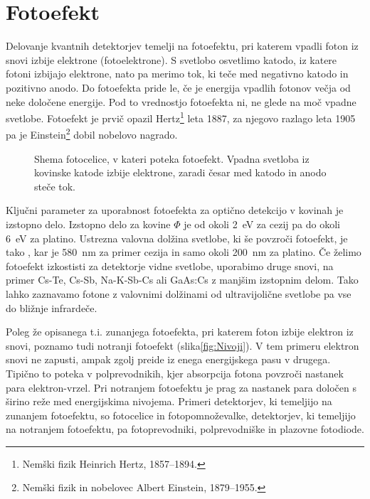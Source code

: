 \section{Fotoefekt}
Delovanje kvantnih detektorjev temelji na fotoefektu, pri katerem vpadli
foton iz snovi izbije elektrone (fotoelektrone). S svetlobo
osvetlimo katodo, iz katere fotoni izbijajo elektrone, nato pa merimo tok, 
ki teče med negativno katodo in pozitivno anodo. 
Do fotoefekta pride le, če je energija vpadlih fotonov večja od neke določene energije.
Pod to vrednostjo fotoefekta ni, ne glede na moč vpadne svetlobe.
Fotoefekt je prvič opazil Hertz\footnote{Nemški fizik Heinrich Hertz, 1857--1894.} 
leta 1887, za njegovo razlago leta
1905 pa je Einstein\footnote{Nemški fizik in nobelovec Albert Einstein, 1879--1955.} 
dobil nobelovo nagrado. 

\begin{figure}[h]
\centering
\def\svgwidth{60truemm} 

\caption{Shema fotocelice, v kateri poteka fotoefekt. 
Vpadna svetloba iz kovinske katode izbije elektrone, zaradi česar med katodo 
in anodo steče tok.}
\label{fig:Fotoefekt}
\end{figure}

Ključni parameter za uporabnost fotoefekta za optično detekcijo v kovinah je izstopno delo.
Izstopno delo za kovine $\Phi$ je od okoli 2~eV za cezij pa do okoli 6~eV za platino. 
Ustrezna valovna dolžina svetlobe, ki še povzroči fotoefekt, je tako 
\beq
\lambda \leq {},
\eeq
kar je 580~nm za primer cezija in samo okoli 200~nm za platino. Če želimo fotoefekt
izkostisti za detektorje vidne svetlobe, uporabimo druge snovi,
na primer Cs-Te, Cs-Sb, Na-K-Sb-Cs ali GaAs:Cs z manjšim izstopnim delom. Tako lahko zaznavamo 
fotone z valovnimi dolžinami od ultravijolične svetlobe pa vse do bližnje infrardeče. 

Poleg že opisanega t.i. zunanjega fotoefekta, pri katerem foton izbije elektron iz snovi,
poznamo tudi notranji fotoefekt (slika\ref{fig:Nivoji}). V tem primeru elektron snovi ne zapusti, ampak 
zgolj preide iz enega energijskega pasu v drugega. Tipično to poteka v polprevodnikih,
kjer absorpcija fotona povzroči nastanek para elektron-vrzel. Pri notranjem fotoefektu
je prag za nastanek para določen s širino reže med energijskima nivojema. 
Primeri detektorjev, ki temeljijo na zunanjem fotoefektu, so 
fotocelice in fotopomnoževalke, detektorjev, ki temeljijo na notranjem fotoefektu, pa
fotoprevodniki, polprevodniške in plazovne fotodiode.

